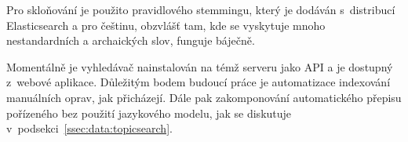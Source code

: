 Pro skloňování je použito pravidlového stemmingu, který je dodáván s~distribucí
Elasticsearch a pro češtinu, obzvlášť tam, kde se vyskytuje mnoho
nestandardních a archaických slov, funguje báječně.

Momentálně je vyhledávač nainstalován na témž serveru jako API a je dostupný
z~webové aplikace. Důležitým bodem budoucí práce je automatizace indexování
manuálních oprav, jak přicházejí. Dále pak zakomponování automatického přepisu
pořízeného bez použití jazykového modelu, jak se diskutuje
v~podsekci~\ref{ssec:data:topicsearch}.

